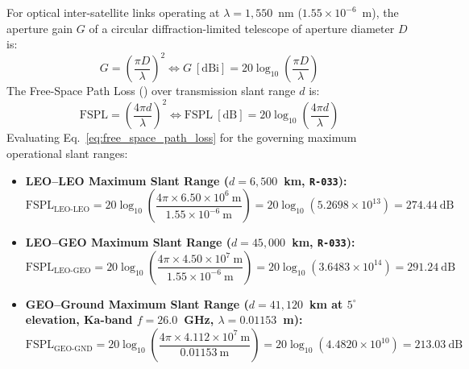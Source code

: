 For optical inter-satellite links operating at $\lambda = 1{,}550$~nm ($1.55 \times 10^{-6}$~m), the aperture gain $G$ of a circular diffraction-limited telescope of aperture diameter $D$ is:
\begin{equation}
    G = \left(\frac{\pi D}{\lambda}\right)^2 \iff G~[\text{dBi}] = 20\log_{10}\left(\frac{\pi D}{\lambda}\right)
    \label{eq:optical_aperture_gain}
\end{equation}
The Free-Space Path Loss () over transmission slant range $d$ is:
\begin{equation}
    \text{FSPL} = \left(\frac{4\pi d}{\lambda}\right)^2 \iff \text{FSPL}~[\text{dB}] = 20\log_{10}\left(\frac{4\pi d}{\lambda}\right)
    \label{eq:free_space_path_loss}
\end{equation}
Evaluating Eq.~\eqref{eq:free_space_path_loss} for the governing maximum operational slant ranges:
\begin{itemize}
    \item \textbf{LEO--LEO Maximum Slant Range ($d = 6{,}500$~km, \texttt{R-033}):}
    \begin{equation}
        \text{FSPL}_{\text{LEO-LEO}} = 20\log_{10}\left(\frac{4\pi \times 6.50 \times 10^6~\text{m}}{1.55 \times 10^{-6}~\text{m}}\right) = 20\log_{10}(5.2698 \times 10^{13}) = 274.44~\text{dB}
    \end{equation}
    \item \textbf{LEO--GEO Maximum Slant Range ($d = 45{,}000$~km, \texttt{R-033}):}
    \begin{equation}
        \text{FSPL}_{\text{LEO-GEO}} = 20\log_{10}\left(\frac{4\pi \times 4.50 \times 10^7~\text{m}}{1.55 \times 10^{-6}~\text{m}}\right) = 20\log_{10}(3.6483 \times 10^{14}) = 291.24~\text{dB}
    \end{equation}
    \item \textbf{GEO--Ground Maximum Slant Range ($d = 41{,}120$~km at $5^\circ$ elevation, Ka-band $f = 26.0$~GHz, $\lambda = 0.01153$~m):}
    \begin{equation}
        \text{FSPL}_{\text{GEO-GND}} = 20\log_{10}\left(\frac{4\pi \times 4.112 \times 10^7~\text{m}}{0.01153~\text{m}}\right) = 20\log_{10}(4.4820 \times 10^{10}) = 213.03~\text{dB}
    \end{equation}
\end{itemize}

